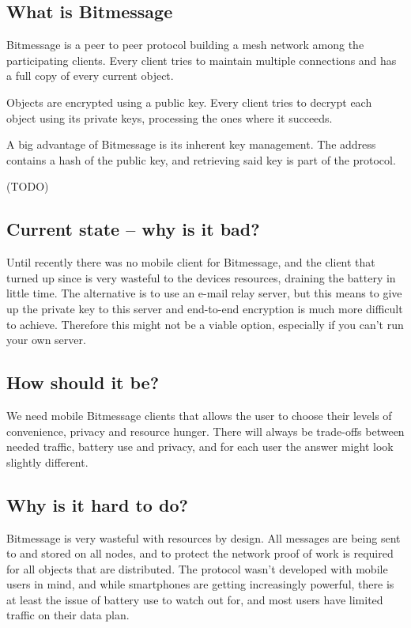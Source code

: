 \documentclass{bfh}
\begin{document}
  \subsection{What is Bitmessage}
  
  Bitmessage is a peer to peer protocol building a mesh network among the participating clients. Every client tries to maintain multiple connections and has a full copy of every current object.
  
  Objects are encrypted using a public key. Every client tries to decrypt each object using its private keys, processing the ones where it succeeds.
  
  A big advantage of Bitmessage is its inherent key management. The address contains a hash of the public key, and retrieving said key is part of the protocol.

  (TODO)\newpage

  \subsection{Current state -- why is it bad?}
  Until recently there was no mobile client for Bitmessage, and the client that turned up since is very wasteful to the devices resources, draining the battery in little time. The alternative is to use an e-mail relay server, but this means to give up the private key to this server and end-to-end encryption is much more difficult to achieve. Therefore this might not be a viable option, especially if you can't run your own server.

  \subsection{How should it be?}
  We need mobile Bitmessage clients that allows the user to choose their levels of convenience, privacy and resource hunger. There will always be trade-offs between needed traffic, battery use and privacy, and for each user the answer might look slightly different.

  \subsection{Why is it hard to do?}
  Bitmessage is very wasteful with resources by design. All messages are being sent to and stored on all nodes, and to protect the network proof of work is required for all objects that are distributed. The protocol wasn't developed with mobile users in mind, and while smartphones are getting increasingly powerful, there is at least the issue of battery use to watch out for, and most users have limited traffic on their data plan.
\end{document}
